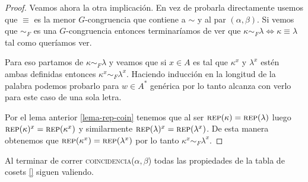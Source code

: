 \documentclass[tesis.tex]{subfiles}
\newcommand{\rep}{\textsc{rep}}
\newcommand{\coin}{\textsc{coincidencia}}
\begin{document}
\begin{proof}
     
%    
    Veamos ahora la otra implicación. 
    En vez de probarla directamente usemos que $\equiv$ es la menor $G$-congruencia que contiene a $\sim$ y al par $(\alpha, \beta)$. 
    Si vemos que $\sim_F$ es una $G$-congruencia entonces terminaríamos de ver que $\kappa \sim_F \lambda \iff \kappa \equiv \lambda$ tal como queríamos ver.
       
    Para eso partamos de $\kappa \sim_F \lambda$ y veamos que si $x \in A$ es tal que $\kappa^x$ y $\lambda^x$ estén ambas definidas entonces $\kappa^x \sim_F \lambda^x$.
    Haciendo inducción en la longitud de la palabra podemos probarlo para $w \in A^*$ genérica por lo tanto alcanza con verlo para este caso de una sola letra.
    
    Por el lema anterior \ref{lema-rep-coin} tenemos que al ser $\rep(\kappa) = \rep(\lambda )$ luego $\rep(\kappa)^x = \rep(\kappa^x)$ y similarmente $\rep(\lambda)^x = \rep(\lambda^x)$. 
    De esta manera obtenemos que $\rep (\kappa^x) = \rep(\lambda^x)$ por lo tanto $\kappa^x \sim_F \lambda^x$.
\end{proof}

\begin{prop}
	Al terminar de correr \coin($\alpha, \beta$) todas las propiedades de la tabla de cosets \ref{} siguen valiendo.
\end{prop}
\end{document}

